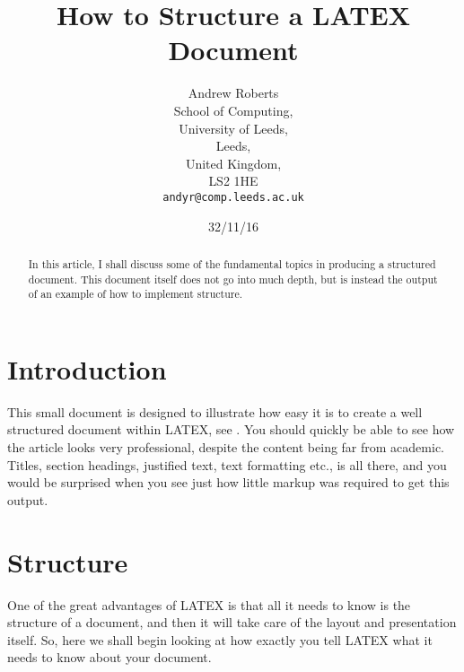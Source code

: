 \documentclass{article}
\begin{document}

\title{How to Structure a LATEX Document}

\author{Andrew Roberts\\ %
        School of Computing,\\
		University of Leeds,\\
		Leeds,\\
		United Kingdom,\\
		LS2 1HE\\
		\texttt{andyr@comp.leeds.ac.uk}}  %

\date{32/11/16} %

\maketitle %

\begin{abstract}
In this article, I shall discuss some of the fundamental topics in
producing a structured document.  This document itself does not go into
much depth, but is instead the output of an example of how to implement
structure.
\end{abstract}

\section{\label{intro} Introduction} %

This small document is designed to illustrate how easy it is to create a
well structured document within LATEX, see \cite{lamport94}.  You should quickly be able to
see how the article looks very professional, despite the content being
far from academic.  Titles, section headings, justified text, text
formatting etc., is all there, and you would be surprised when you see
just how little markup was required to get this output.

\section{\label{str} Structure}
One of the great advantages of LATEX is that all it needs to know is
the structure of a document, and then it will take care of the layout
and presentation itself.  So, here we shall begin looking at how exactly
you tell LATEX what it needs to know about your document.
\end{document}

